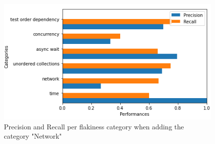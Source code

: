 \begin{figure}[htbp]
\centering
\includegraphics[scale=0.8]{figures/flakycat/add_network.PNG}
\caption{Precision and Recall per flakiness category when adding the category "Network" }
\label{fig:fsl_add_class}
\end{figure}
\vspace{-2mm}

 






